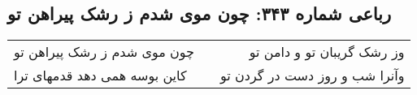 \begin{center}
\section*{رباعی شماره ۳۴۳: چون موی شدم ز رشک پیراهن تو}
\label{sec:sh343}
\begin{longtable}{l p{0.5cm} r}
چون موی شدم ز رشک پیراهن تو
&&
وز رشک گریبان تو و دامن تو
\\
کاین بوسه همی دهد قدمهای ترا
&&
وآنرا شب و روز دست در گردن تو
\\
\end{longtable}
\end{center}
